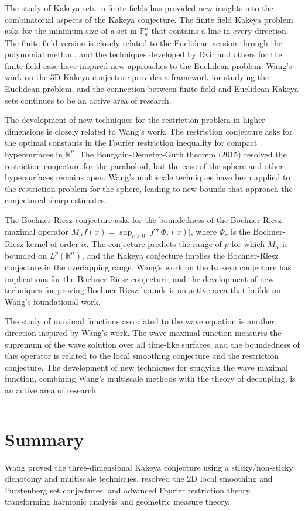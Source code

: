 The study of Kakeya sets in finite fields has provided new insights into the combinatorial aspects of the Kakeya conjecture. The finite field Kakeya problem asks for the minimum size of a set in $\mathbb{F}_q^n$ that contains a line in every direction. The finite field version is closely related to the Euclidean version through the polynomial method, and the techniques developed by Dvir and others for the finite field case have inspired new approaches to the Euclidean problem. Wang's work on the 3D Kakeya conjecture provides a framework for studying the Euclidean problem, and the connection between finite field and Euclidean Kakeya sets continues to be an active area of research.

The development of new techniques for the restriction problem in higher dimensions is closely related to Wang's work. The restriction conjecture asks for the optimal constants in the Fourier restriction inequality for compact hypersurfaces in $\mathbb{R}^n$. The Bourgain-Demeter-Guth theorem (2015) resolved the restriction conjecture for the paraboloid, but the case of the sphere and other hypersurfaces remains open. Wang's multiscale techniques have been applied to the restriction problem for the sphere, leading to new bounds that approach the conjectured sharp estimates.

The Bochner-Riesz conjecture asks for the boundedness of the Bochner-Riesz maximal operator $M_\alpha f(x) = \sup_{r>0} |f * \Phi_r(x)|$, where $\Phi_r$ is the Bochner-Riesz kernel of order $\alpha$. The conjecture predicts the range of $p$ for which $M_\alpha$ is bounded on $L^p(\mathbb{R}^n)$, and the Kakeya conjecture implies the Bochner-Riesz conjecture in the overlapping range. Wang's work on the Kakeya conjecture has implications for the Bochner-Riesz conjecture, and the development of new techniques for proving Bochner-Riesz bounds is an active area that builds on Wang's foundational work.

The study of maximal functions associated to the wave equation is another direction inspired by Wang's work. The wave maximal function measures the supremum of the wave solution over all time-like surfaces, and the boundedness of this operator is related to the local smoothing conjecture and the restriction conjecture. The development of new techniques for studying the wave maximal function, combining Wang's multiscale methods with the theory of decoupling, is an active area of research.

\begin{center}\rule{0.5\linewidth}{0.5pt}\end{center}

\section*{Summary}

Wang proved the three-dimensional Kakeya conjecture using a sticky/non-sticky dichotomy and multiscale techniques, resolved the 2D local smoothing and Furstenberg set conjectures, and advanced Fourier restriction theory, transforming harmonic analysis and geometric measure theory.
